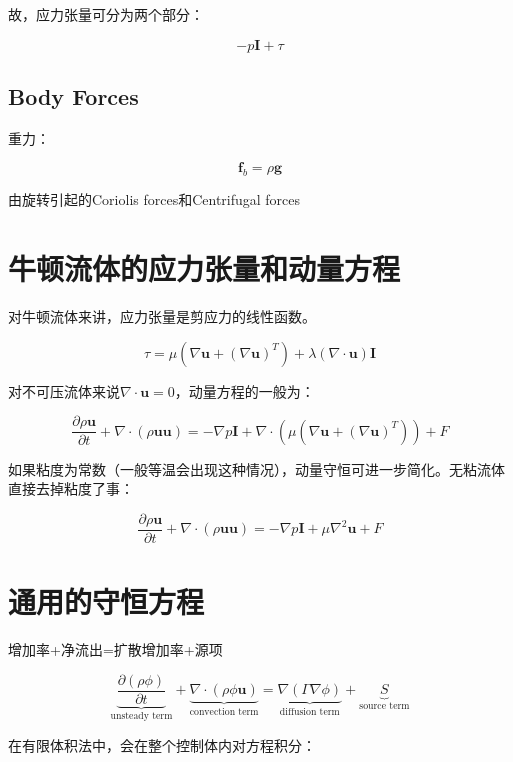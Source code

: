 故，应力张量可分为两个部分：

\[-p\bm{I}+\tau\]

\subsection{Body Forces}

重力：

\[\bm{f}_b = \rho \bm{g}\]

由旋转引起的Coriolis forces和Centrifugal forces

\section{牛顿流体的应力张量和动量方程}
对牛顿流体来讲，应力张量是剪应力的线性函数。

\begin{equation}
\tau = \mu\left(\nabla\bm{u}+(\nabla\bm{u})^T\right)+\lambda(\nabla\cdot \bm{u})\bm{I}
\end{equation}

对不可压流体来说$ \nabla\cdot\bm{u} = 0 $，动量方程的一般为：

\begin{equation}
\frac{\partial \rho\bm{u}}{\partial t} + \nabla\cdot(\rho\bm{uu}) = -\nabla p\bm{I} + \nabla\cdot(\mu\left(\nabla\bm{u}+(\nabla\bm{u})^T\right)) + F
\end{equation}

如果粘度为常数（一般等温会出现这种情况），动量守恒可进一步简化。无粘流体直接去掉粘度了事：

\begin{equation}
\frac{\partial \rho\bm{u}}{\partial t} + \nabla\cdot(\rho\bm{uu}) = -\nabla p\bm{I} + \mu\nabla^2\bm{u} + F
\end{equation}

\section{通用的守恒方程}
增加率+净流出=扩散增加率+源项

\begin{equation}
\underbrace{\frac{\partial (\rho\phi)}{\partial t}}_{\text{unsteady term}} +
\underbrace{\nabla\cdot(\rho\phi\bm{u})}_{\text{convection term}} =
\underbrace{\nabla(\Gamma\nabla\phi)}_{\text{diffusion term}} +
\underbrace{S}_{\text{source term}}
\end{equation}

在有限体积法中，会在整个控制体内对方程积分：


